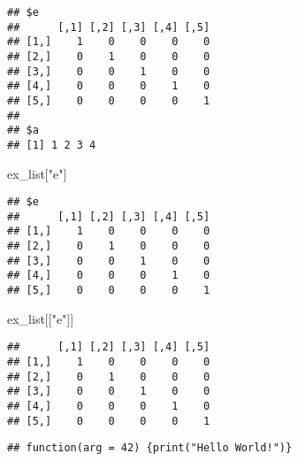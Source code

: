 \documentclass[
]{article}
\newenvironment{Shaded}{\begin{snugshade}}{\end{snugshade}}
\newcommand{\AttributeTok}[1]{\textcolor[rgb]{0.77,0.63,0.00}{#1}}
\newcommand{\DecValTok}[1]{\textcolor[rgb]{0.00,0.00,0.81}{#1}}
\newcommand{\FunctionTok}[1]{\textcolor[rgb]{0.00,0.00,0.00}{#1}}
\newcommand{\NormalTok}[1]{#1}
\newcommand{\SpecialCharTok}[1]{\textcolor[rgb]{0.00,0.00,0.00}{#1}}
\newcommand{\StringTok}[1]{\textcolor[rgb]{0.31,0.60,0.02}{#1}}
\begin{document}
\begin{verbatim}
## $e
##      [,1] [,2] [,3] [,4] [,5]
## [1,]    1    0    0    0    0
## [2,]    0    1    0    0    0
## [3,]    0    0    1    0    0
## [4,]    0    0    0    1    0
## [5,]    0    0    0    0    1
## 
## $a
## [1] 1 2 3 4
\end{verbatim}

\begin{Shaded}
\begin{Highlighting}[]
\NormalTok{ex\_list[}\StringTok{"e"}\NormalTok{]}
\end{Highlighting}
\end{Shaded}

\begin{verbatim}
## $e
##      [,1] [,2] [,3] [,4] [,5]
## [1,]    1    0    0    0    0
## [2,]    0    1    0    0    0
## [3,]    0    0    1    0    0
## [4,]    0    0    0    1    0
## [5,]    0    0    0    0    1
\end{verbatim}

\begin{Shaded}
\begin{Highlighting}[]
\NormalTok{ex\_list[[}\StringTok{"e"}\NormalTok{]]}
\end{Highlighting}
\end{Shaded}

\begin{verbatim}
##      [,1] [,2] [,3] [,4] [,5]
## [1,]    1    0    0    0    0
## [2,]    0    1    0    0    0
## [3,]    0    0    1    0    0
## [4,]    0    0    0    1    0
## [5,]    0    0    0    0    1
\end{verbatim}

\begin{Shaded}
\end{Shaded}

\begin{verbatim}
## function(arg = 42) {print("Hello World!")}
\end{verbatim}

\begin{Shaded}
\end{Shaded}
\end{document}
